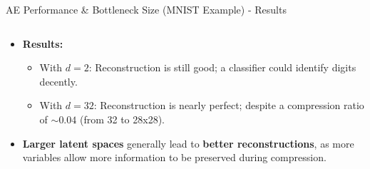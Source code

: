 \documentclass[serif, aspectratio=169]{beamer}
\begin{document}
\begin{frame}{AE Performance \& Bottleneck Size (MNIST Example) - Results}
    \begin{columns}[t] 
        \begin{column}{0.65\textwidth} 
            \begin{itemize}
                \item \textbf{Results:}
                \begin{itemize}
                \footnotesize
                    \item With \( d=2 \): Reconstruction is still good; a classifier could identify digits decently.
                    \item With \( d=32 \): Reconstruction is nearly perfect; despite a compression ratio of \(\sim0.04\) (from 32 to 28x28).
                \end{itemize}
                \vspace{1cm}
                \item \textbf{Larger latent spaces} generally lead to \textbf{better reconstructions}, as more variables allow more information to be preserved during compression.
            \end{itemize}
        \end{column}
        

\end{columns}
\end{frame}
\end{document}
